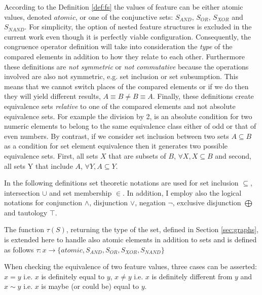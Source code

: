 According to the Definition \ref{def:fs} the values of feature can be either atomic values, denoted $atomic$, or one of the conjunctive sets: $S_{AND}$, $S_{OR}$, $S_{XOR}$ and $S_{NAND}$. For simplicity, the option of nested feature structures is excluded in the current work even though it is perfectly viable configuration. Consequently, the congruence operator definition will take into consideration the \textit{type} of the compared elements in addition to how they relate to each other. 
Furthermore these definitions are \textit{not symmetric} or \textit{not commutative} because the operations involved are also not symmetric, e.g. set inclusion or set subsumption. This means that we cannot switch places of the compared elements or if we do then they will yield different results, $A \equiv B \neq B \equiv A $. Finally, these definitions create equivalence sets \textit{relative} to one of the compared elements and not absolute equivalence sets. For example the division by 2, is an absolute condition for two numeric elements to belong to the same equivalence class either of odd or that of even numbers. By contrast, if we consider set inclusion between two sets $A \subseteq B$ as a condition for set element equivalence then it generates two possible equivalence sets. First, all sets $X$ that are subsets of $B$, $\forall X, X \subseteq B$ and second, all sets Y that include $A$,  $ \forall Y, A \subseteq Y $. 


In the following definitions set theoretic notations are used for set inclusion $\subseteq$, intersection $\cup$ and set membership $\in$. In addition, I employ also the logical notations for conjunction 
$\wedge$, disjunction $\vee$, negation $\neg$, exclusive disjunction $\bigoplus$ and tautology $\top$. 


The function $\tau(S)$, returning the type of the set, defined in Section \ref{sec:graphs}, is extended here to handle also atomic elements in addition to sets and is defined as follows $\tau:x \rightarrow \{atomic, S_{AND}, S_{OR}, S_{XOR}, S_{NAND} \}$

When checking the equivalence of two feature values, three cases can be asserted: $x=y$ i.e. $x$ is definitely equal to $y$, $x\neq y$ i.e. $x$ is definitely different from $y$ and $x\sim y$ i.e. $x$ is maybe (or could be) equal to $y$. 

